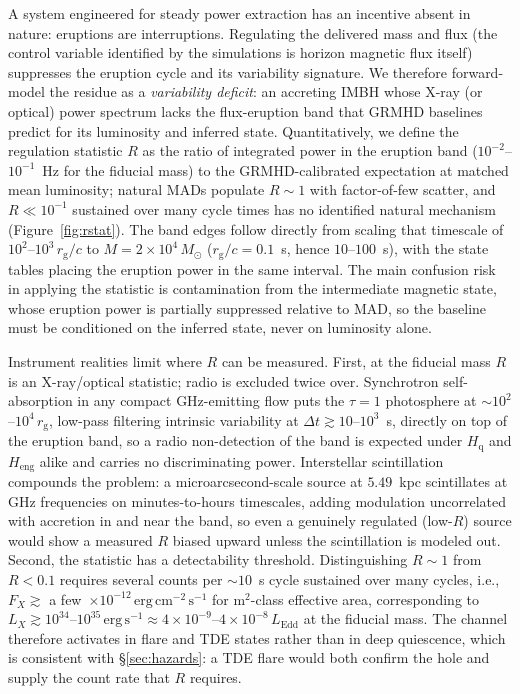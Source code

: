 \documentclass[11pt]{article}
\newcommand{\msun}{\ensuremath{M_\odot}}
\newcommand{\rg}{\ensuremath{r_{\mathrm{g}}}}
\newcommand{\Heng}{\ensuremath{H_{\mathrm{eng}}}}
\newcommand{\Hgas}{\ensuremath{H_{\mathrm{q}}}}
\begin{document}
A system engineered for steady power extraction has an incentive absent in nature: eruptions are interruptions. Regulating the delivered mass and flux (the control variable identified by the simulations is horizon magnetic flux itself) suppresses the eruption cycle and its variability signature. We therefore forward-model the residue as a \emph{variability deficit}: an accreting IMBH whose X-ray (or optical) power spectrum lacks the flux-eruption band that GRMHD baselines predict for its luminosity and inferred state. Quantitatively, we define the regulation statistic $R$ as the ratio of integrated power in the eruption band ($10^{-2}$--$10^{-1}$~Hz for the fiducial mass) to the GRMHD-calibrated expectation at matched mean luminosity; natural MADs populate $R \sim 1$ with factor-of-few scatter, and $R \ll 10^{-1}$ sustained over many cycle times has no identified natural mechanism (Figure~\ref{fig:rstat}). The band edges follow directly from scaling that timescale of $10^{2}$--$10^{3}\,\rg/c$ to $M = 2\times10^{4}\,\msun$ ($\rg/c = 0.1$~s, hence $10$--$100$~s), with the \citet{Universe2026MAD} state tables placing the eruption power in the same interval. The main confusion risk in applying the statistic is contamination from the intermediate magnetic state, whose eruption power is partially suppressed relative to MAD, so the baseline must be conditioned on the inferred state, never on luminosity alone.

Instrument realities limit where $R$ can be measured. First, at the fiducial mass $R$ is an X-ray/optical statistic; radio is excluded twice over. Synchrotron self-absorption in any compact GHz-emitting flow puts the $\tau = 1$ photosphere at $\sim 10^{2}$--$10^{4}\,\rg$, low-pass filtering intrinsic variability at $\Delta t \gtrsim 10$--$10^{3}$~s, directly on top of the eruption band, so a radio non-detection of the band is expected under \Hgas{} and \Heng{} alike and carries no discriminating power. Interstellar scintillation compounds the problem: a microarcsecond-scale source at $5.49$~kpc scintillates at GHz frequencies on minutes-to-hours timescales, adding modulation uncorrelated with accretion in and near the band, so even a genuinely regulated (low-$R$) source would show a measured $R$ biased upward unless the scintillation is modeled out. Second, the statistic has a detectability threshold. Distinguishing $R \sim 1$ from $R < 0.1$ requires several counts per $\sim 10$~s cycle sustained over many cycles, i.e., $F_{X} \gtrsim$ a few~$\times10^{-12}\,\mathrm{erg\,cm^{-2}\,s^{-1}}$ for m$^{2}$-class effective area, corresponding to $L_{X} \gtrsim 10^{34}$--$10^{35}\,\mathrm{erg\,s^{-1}} \approx 4\times10^{-9}$--$4\times10^{-8}\,L_{\mathrm{Edd}}$ at the fiducial mass. The channel therefore activates in flare and TDE states rather than in deep quiescence, which is consistent with \S\ref{sec:hazards}: a TDE flare would both confirm the hole and supply the count rate that $R$ requires.
\end{document}
